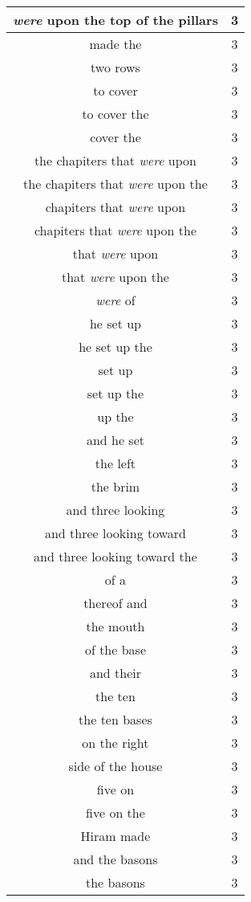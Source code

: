 \begin{center}
\begin{longtable}{|c|c|}
\emph{were} upon the top of the pillars & 3\\ \hline 
made the & 3\\ \hline 
two rows & 3\\ \hline 
to cover & 3\\ \hline 
to cover the & 3\\ \hline 
cover the & 3\\ \hline 
the chapiters that \emph{were} upon & 3\\ \hline 
the chapiters that \emph{were} upon the & 3\\ \hline 
chapiters that \emph{were} upon & 3\\ \hline 
chapiters that \emph{were} upon the & 3\\ \hline 
that \emph{were} upon & 3\\ \hline 
that \emph{were} upon the & 3\\ \hline 
\emph{were} of & 3\\ \hline 
he set up & 3\\ \hline 
he set up the & 3\\ \hline 
set up & 3\\ \hline 
set up the & 3\\ \hline 
up the & 3\\ \hline 
and he set & 3\\ \hline 
the left & 3\\ \hline 
the brim & 3\\ \hline 
and three looking & 3\\ \hline 
and three looking toward & 3\\ \hline 
and three looking toward the & 3\\ \hline 
of a & 3\\ \hline 
thereof and & 3\\ \hline 
the mouth & 3\\ \hline 
of the base & 3\\ \hline 
and their & 3\\ \hline 
the ten & 3\\ \hline 
the ten bases & 3\\ \hline 
on the right & 3\\ \hline 
side of the house & 3\\ \hline 
five on & 3\\ \hline 
five on the & 3\\ \hline 
Hiram made & 3\\ \hline 
and the basons & 3\\ \hline 
the basons & 3\\ \hline 

\end{longtable}
\end{center}

